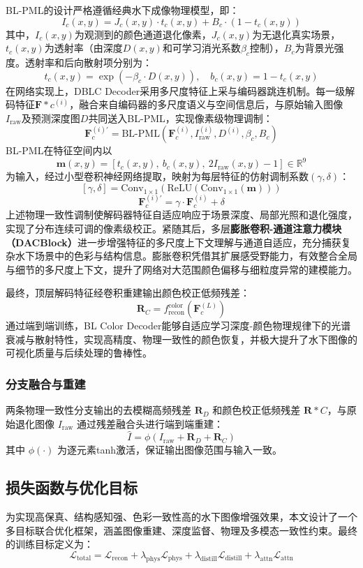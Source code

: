 \documentclass[twocolumn]{article}
\begin{document}
BL-PML的设计严格遵循经典水下成像物理模型\cite{ref1}，即：
\[
I_c(x,y) = J_c(x,y) \cdot t_c(x,y) + B_c \cdot (1 - t_c(x,y))
\]
其中，$I_c(x,y)$为观测到的颜色通道退化像素，$J_c(x,y)$为无退化真实场景，$t_c(x,y)$为透射率（由深度$D(x,y)$和可学习消光系数$\beta_c$控制），$B_c$为背景光强度。透射率和后向散射项分别为：
\[
t_c(x,y) = \exp\left(-\beta_c \cdot D(x,y)\right), \quad b_c(x,y) = 1 - t_c(x,y)
\]
在网络实现上，DBLC Decoder采用多尺度特征上采与编码器跳连机制。每一级解码特征$\mathbf{F}*c^{(i)}$，融合来自编码器的多尺度语义与空间信息后，与原始输入图像$ I_{\mathrm{raw}} $及预测深度图$ D $共同送入BL-PML，实现像素级物理调制：
\[
\mathbf{F}_c^{(i)'} = \mathrm{BL}\text{-}\mathrm{PML}\left(\mathbf{F}_c^{(i)}, I_{\mathrm{raw}}^{(i)}, D^{(i)}, \beta_c, B_c\right)
\]
BL-PML在特征空间内以
\[
\mathbf{m}(x,y) = \left[t_c(x,y),\ b_c(x,y),\ 2I_{\mathrm{raw}}(x,y) - 1\right] \in \mathbb{R}^9
\]
为输入，经过小型卷积神经网络提取，映射为每层特征的仿射调制系数$(\gamma, \delta)$：
\[
[\gamma, \delta] = \mathrm{Conv}_{1\times1}\left(\mathrm{ReLU}(\mathrm{Conv}_{1\times1}(\mathbf{m}))\right)
\]
\[
\mathbf{F}_c^{(i)'} = \gamma \cdot \mathbf{F}_c^{(i)} + \delta
\]
上述物理一致性调制使解码器特征自适应响应于场景深度、局部光照和退化强度，实现了分布连续可调的像素级校正。紧随其后，多层\textbf{膨胀卷积-通道注意力模块（DACBlock）}进一步增强特征的多尺度上下文理解与通道自适应，充分捕获复杂水下场景中的色彩与结构信息。膨胀卷积凭借其扩展感受野能力，有效整合全局与细节的多尺度上下文，提升了网络对大范围颜色偏移与细粒度异常的建模能力。

最终，顶层解码特征经卷积重建输出颜色校正低频残差：
\[
\mathbf{R}_C = f_{\mathrm{recon}}^{\mathrm{color}}\left(\mathbf{F}_c^{(L)}\right)
\]
通过端到端训练，BL Color Decoder能够自适应学习深度-颜色物理规律下的光谱衰减与散射特性，实现高精度、物理一致性的颜色恢复，并极大提升了水下图像的可视化质量与后续处理的鲁棒性。

\subsubsection{分支融合与重建}
两条物理一致性分支输出的去模糊高频残差 $ \mathbf{R}_D $ 和颜色校正低频残差 $ \mathbf{R}*C $，与原始退化图像 $I_{\mathrm{raw}}$ 通过残差融合头进行端到端重建：
\[
\hat{I} = \phi\left(I_{\mathrm{raw}} + \mathbf{R}_D + \mathbf{R}_C\right)
\]
其中 $\phi(\cdot)$ 为逐元素tanh激活，保证输出图像范围与输入一致。



\subsection{损失函数与优化目标}
为实现高保真、结构感知强、色彩一致性高的水下图像增强效果，本文设计了一个多目标联合优化框架，涵盖图像重建、深度监督、物理及多模态一致性约束。最终的训练目标定义为：
\[
\mathcal{L}_{\text{total}} = \mathcal{L}_{\text{recon}} + \lambda_{\text{phys}} \mathcal{L}_{\text{phys}} + \lambda_{\text{distill}} \mathcal{L}_{\text{distill}} + \lambda_{\text{attn}} \mathcal{L}_{\text{attn}}
\]
\end{document}

